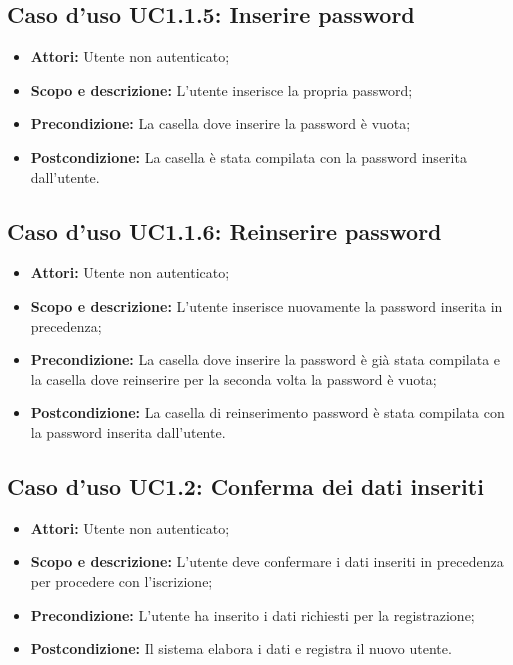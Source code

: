 \subsection{Caso d'uso UC1.1.5: Inserire password}
\begin{itemize}
	\item \textbf{Attori:} Utente non autenticato;
	\item \textbf{Scopo e descrizione:} L'utente inserisce la propria password;
	\item \textbf{Precondizione:} La casella dove inserire la password è vuota;
	\item \textbf{Postcondizione:} La casella è stata compilata con la password inserita dall'utente.
\end{itemize}

\subsection{Caso d'uso UC1.1.6: Reinserire password}
\begin{itemize}
	\item \textbf{Attori:} Utente non autenticato;
	\item \textbf{Scopo e descrizione:} L'utente inserisce nuovamente la password inserita in precedenza;
	\item \textbf{Precondizione:} La casella dove inserire la password è già stata compilata e la casella dove reinserire per la seconda volta la password è vuota;
	\item \textbf{Postcondizione:} La casella di reinserimento password è stata compilata con la password inserita dall'utente.
\end{itemize}

\subsection{Caso d'uso UC1.2: Conferma dei dati inseriti}
\begin{itemize}
	\item \textbf{Attori:} Utente non autenticato;
	\item \textbf{Scopo e descrizione:} L'utente deve confermare i dati inseriti in precedenza per procedere con l'iscrizione;
	\item \textbf{Precondizione:} L'utente ha inserito i dati richiesti per la registrazione;
	\item \textbf{Postcondizione:} Il sistema elabora i dati e registra il nuovo utente.
\end{itemize}

